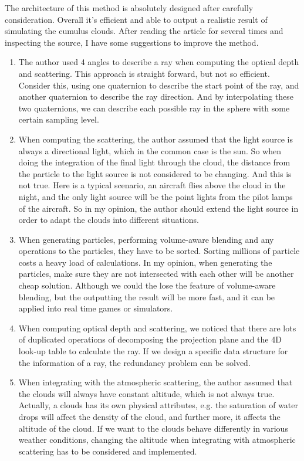 The architecture of this method is absolutely designed after carefully consideration. Overall it's efficient and able to output a realistic result of simulating the cumulus clouds. After reading the article for several times and inspecting the source, I have some suggestions to improve the method.

\begin{enumerate}
\item The author used 4 angles to describe a ray when computing the optical depth and scattering. This approach is straight forward, but not so efficient. Consider this, using one quaternion to describe the start point of the ray, and another quaternion to describe the ray direction. And by interpolating these two quaternions, we can describe each possible ray in the sphere with some certain sampling level.

\item When computing the scattering, the author assumed that the light source is always a directional light, which in the common case is the sun. So when doing the integration of the final light through the cloud, the distance from the particle to the light source is not considered to be changing. And this is not true. Here is a typical scenario, an aircraft flies above the cloud in the night, and the only light source will be the point lights from the pilot lamps of the aircraft. So in my opinion, the author should extend the light source in order to adapt the clouds into different situations.

\item When generating particles, performing volume-aware blending and any operations to the particles, they have to be sorted. Sorting millions of particle costs a heavy load of calculations. In my opinion, when generating the particles, make sure they are not intersected with each other will be another cheap solution. Although we could the lose the feature of volume-aware blending, but the outputting the result will be more fast, and it can be applied into real time games or simulators.

\item  When computing optical depth and scattering, we noticed that there are lots of duplicated operations of decomposing the projection plane and the 4D look-up table to calculate the ray. If we design a specific data structure for the information of a ray, the redundancy problem can be solved.

\item When integrating with the atmospheric scattering, the author assumed that the clouds will always have constant altitude, which is not always true. Actually, a clouds has its own physical attributes, e.g. the saturation of water drops will affect the density of the cloud, and further more, it affects the altitude of the cloud. If we want to the clouds behave differently in various weather conditions, changing the altitude when integrating with atmospheric scattering has to be considered and implemented.


\end{enumerate}
